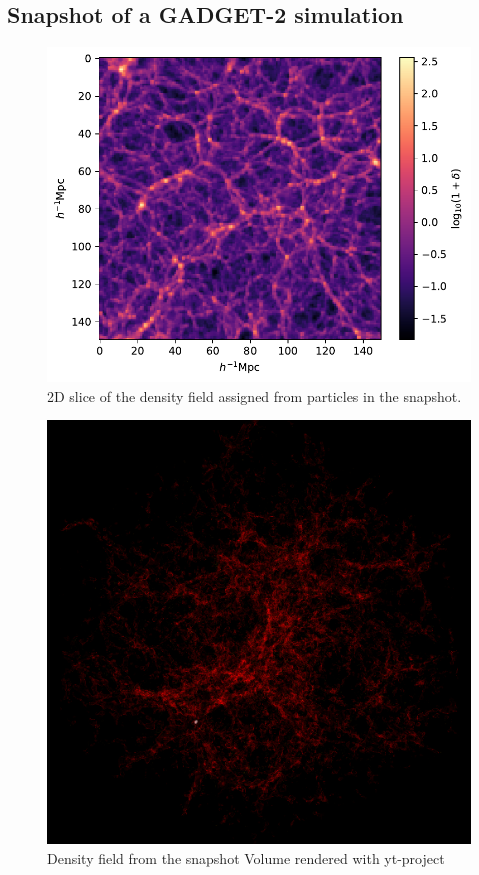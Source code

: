 \documentclass[12pt]{article}
\begin{document}
%


\subsection*{Snapshot of a GADGET-2 simulation}
\cite{aseem_shadab}


\begin{figure}[H]
	\centering
	\includegraphics[width=0.7\linewidth]{../density_assign/density-field-2D}
	\caption{2D slice of the density field assigned from particles in the snapshot.}
	\label{fig:density-field-2d}
\end{figure}


\begin{figure}[H]
	\centering
	\includegraphics[width=0.5\linewidth]{../density_assign/UniformGridData_Render_density}
	\caption{Density field from the snapshot \quad
		 Volume rendered with yt-project}
	\label{fig:uniformgriddatarenderdensity}
\end{figure}
\end{document}
